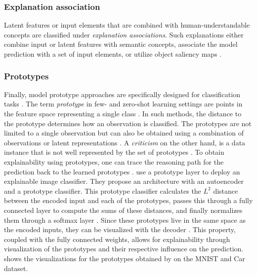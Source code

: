 \subsubsection{Explanation association}
Latent features or input elements that are combined with human-understandable concepts are classified under \emph{explanation associations}. Such explanations either combine input or latent features with semantic concepts, associate the model prediction with a set of input elements, or utilize object saliency maps \citep{xie2020explainable}.

\subsubsection{Prototypes}
\label{sec:prototypes}

Finally, model prototype approaches are specifically designed for classification tasks \citep{Bien2011, KimRS14, PriebeMDS03, wu2017prototypal}. The term \emph{prototype} in few- and zero-shot learning settings are points in the feature space representing a single class \citep{LiLCR18}. In such methods, the distance to the prototype determines how an observation is classified. The prototypes are not limited to a single observation but can also be obtained using a combination of observations or latent representations \citep{xie2020explainable}. A \emph{criticism} on the other hand, is a data instance that is not well represented by the set of prototypes \citep{molnar2019}. To obtain explainability using prototypes, one can trace the reasoning path for the prediction back to the learned prototypes \citep{xie2020explainable}. \citet{LiLCR18} use a prototype layer to deploy an explainable image classifier. They propose an architecture with an autoencoder and a prototype classifier. This prototype classifier calculates the $L^2$ distance between the encoded input and each of the prototypes, passes this through a fully connected layer to compute the sums of these distances, and finally normalizes them through a softmax layer \citep{LiLCR18}. Since these prototypes live in the same space as the encoded inputs, they can be visualized with the decoder \citep{LiLCR18}. This property, coupled with the fully connected weights, allows for explainability through visualization of the prototypes and their respective influence on the prediction.  shows the visualizations for the prototypes obtained by \citet{LiLCR18} on the MNIST \citep{lecun-mnisthandwrittendigit-2010} and Car \citep{FidlerDU12} dataset.

